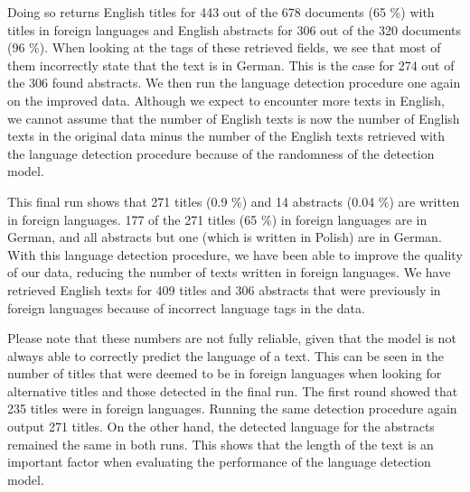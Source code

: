 Doing so returns English titles for 443 out of the 678 documents (65 \%) with titles in foreign languages and English abstracts for 306 out of the 320 documents (96 \%). When looking at the tags of these retrieved fields, we see that most of them incorrectly state that the text is in German. This is the case for 274 out of the 306 found abstracts. We then run the language detection procedure one again on the improved data. Although we expect to encounter more texts in English, we cannot assume that the number of English texts is now the number of English texts in the original data minus the number of the English texts retrieved with the language detection procedure because of the randomness of the detection model.

This final run shows that 271 titles  (0.9 \%) and 14 abstracts (0.04 \%) are written in foreign languages. 177 of the 271 titles (65 \%) in foreign languages are in German, and all abstracts but one (which is written in Polish) are in German. With this language detection procedure, we have been able to improve the quality of our data, reducing the number of texts written in foreign languages. We have retrieved English texts for 409 titles and 306 abstracts that were previously in foreign languages because of incorrect language tags in the data. 

Please note that these numbers are not fully reliable, given that the model is not always able to correctly predict the language of a text. This can be seen in the number of titles that were deemed to be in foreign languages when looking for alternative titles and those detected in the final run. The first round showed that 235 titles were in foreign languages. Running the same detection procedure again output 271 titles. On the other hand, the detected language for the abstracts remained the same in both runs. This shows that the length of the text is an important factor when evaluating the performance of the language detection model.